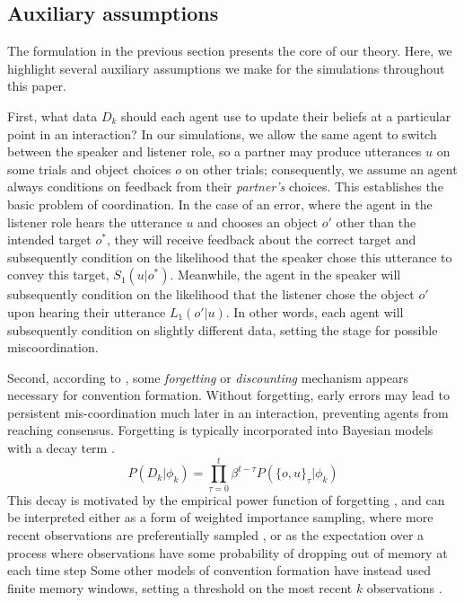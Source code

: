 \subsection{Auxiliary assumptions}

The formulation in the previous section presents the core of our theory.
Here, we highlight several auxiliary assumptions we make for the simulations throughout this paper.

First, what data $D_k$ should each agent use to update their beliefs at a particular point in an interaction?
In our simulations, we allow the same agent to switch between the speaker and listener role, so a partner may produce utterances $u$ on some trials and object choices $o$ on other trials; consequently, we assume an agent always conditions on feedback from their \emph{partner's} choices.
This establishes the basic problem of coordination. 
In the case of an error, where the agent in the listener role hears the utterance $u$ and chooses an object $o'$ other than the intended target $o^*$, they will receive feedback about the correct target and subsequently condition on the likelihood that the speaker chose this utterance to convey this target, $S_1(u | o^*)$. 
Meanwhile, the agent in the speaker will subsequently condition on the likelihood that the listener chose the object $o'$ upon hearing their utterance $L_1(o' | u)$.
In other words, each agent will subsequently condition on slightly different data, setting the stage for possible miscoordination. 

Second, according to , some \emph{forgetting} or \emph{discounting} mechanism appears necessary for convention formation. 
Without forgetting, early errors may lead to persistent mis-coordination much later in an interaction, preventing agents from reaching consensus.
Forgetting is typically incorporated into Bayesian models with a decay term \cite{anderson2000adaptive,angela2009sequential,fudenberg2014recency,kalm2018visual}.
$$P(D_k | \phi_k) = \prod_{\tau=0}^t \beta^{t-\tau} P(\{o,u\}_\tau | \phi_k)$$
This decay is motivated by the empirical power function of forgetting \cite{wixted1991form}, and can be interpreted either as a form of weighted importance sampling, where more recent observations are preferentially sampled \cite{pearl2010online}, or as the expectation over a process where observations have some probability of dropping out of memory at each time step 
Some other models of convention formation have instead used finite memory windows, setting a threshold on the most recent $k$ observations \cite{young_evolution_2015}.


